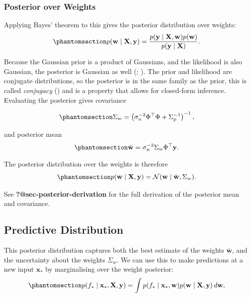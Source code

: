 \documentclass[
  letterpaper,
  DIV=11,
  numbers=noendperiod]{scrartcl}
\begin{document}
\subsubsection{Posterior over Weights}\label{posterior-over-weights}

Applying Bayes' theorem to this gives the posterior distribution over
weights: \begin{equation}\phantomsection\label{eq-bayes-theorem}{
p(\mathbf{w} \mid \mathbf{X}, \mathbf{y}) = \frac{p(\mathbf{y} \mid \mathbf{X}, \mathbf{w}) p(\mathbf{w})}{p(\mathbf{y} \mid \mathbf{X})}.
}\end{equation}

Because the Gaussian prior is a product of Gaussians, and the likelihood
is also Gaussian, the posterior is Gaussian as well
(;
). The
prior and likelihood are conjugate distributions, so the posterior is in
the same family as the prior, this is called \emph{conjugacy}
() and is a
property that allows for closed-form inference. Evaluating the posterior
gives covariance

\begin{equation}\phantomsection\label{eq-posterior-cov}{
\Sigma_w = \left(\sigma_n^{-2}\Phi^\top\Phi + \Sigma_p^{-1}\right)^{-1},
}\end{equation}

and posterior mean
\begin{equation}\phantomsection\label{eq-posterior-mean}{
\bar{\mathbf{w}} = \sigma_n^{-2} \Sigma_w \Phi^\top \mathbf{y}.
}\end{equation}

The posterior distribution over the weights is therefore
\begin{equation}\phantomsection\label{eq-posterior-weights}{
p(\mathbf{w} \mid \mathbf{X}, \mathbf{y}) = \mathcal{N}(\mathbf{w} \mid \bar{\mathbf{w}}, \Sigma_w).
}\end{equation}

See \textbf{?@sec-posterior-derivation} for the full derivation of the
posterior mean and covariance.

\subsection{Predictive Distribution}\label{predictive-distribution}

This posterior distribution captures both the best estimate of the
weights \(\bar{\mathbf{w}}\), and the uncertainty about the weights
\(\Sigma_w\). We can use this to make predictions at a new input
\(\mathbf{x}_*\) by marginalising over the weight posterior:
\begin{equation}\phantomsection\label{eq-predictive-distribution}{
p(f_* \mid \mathbf{x}_*, \mathbf{X}, \mathbf{y}) = \int p(f_* \mid \mathbf{x}_*, \mathbf{w}) p(\mathbf{w} \mid \mathbf{X}, \mathbf{y}) \, d\mathbf{w},
}\end{equation}
\end{document}
